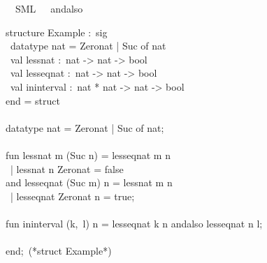 \begin{isabellebody}
\ \ {\isacharparenleft}SML\ \ {}\ {\isachardoublequoteopen}andalso{\isachardoublequoteclose}{\isacharparenright}%
\endisatagquotett
{\isafoldquotett}%
%
\isadelimquotett
%
\endisadelimquotett
%
\isadelimquote
%
\endisadelimquote
%
\isatagquote
%
\begin{isamarkuptext}%
\isatypewriter%
\noindent%
\hspace*{0pt}structure Example :~sig\\
\hspace*{0pt} ~datatype nat = Zero{}nat | Suc of nat\\
\hspace*{0pt} ~val less{}nat :~nat -> nat -> bool\\
\hspace*{0pt} ~val less{}eq{}nat :~nat -> nat -> bool\\
\hspace*{0pt} ~val in{}interval :~nat * nat -> nat -> bool\\
\hspace*{0pt}end = struct\\
\hspace*{0pt}\\
\hspace*{0pt}datatype nat = Zero{}nat | Suc of nat;\\
\hspace*{0pt}\\
\hspace*{0pt}fun less{}nat m (Suc n) = less{}eq{}nat m n\\
\hspace*{0pt} ~| less{}nat n Zero{}nat = false\\
\hspace*{0pt}and less{}eq{}nat (Suc m) n = less{}nat m n\\
\hspace*{0pt} ~| less{}eq{}nat Zero{}nat n = true;\\
\hspace*{0pt}\\
\hspace*{0pt}fun in{}interval (k,~l) n = less{}eq{}nat k n andalso less{}eq{}nat n l;\\
\hspace*{0pt}\\
\hspace*{0pt}end;~(*struct Example*)%
\end{isamarkuptext}%

\end{isabellebody}
